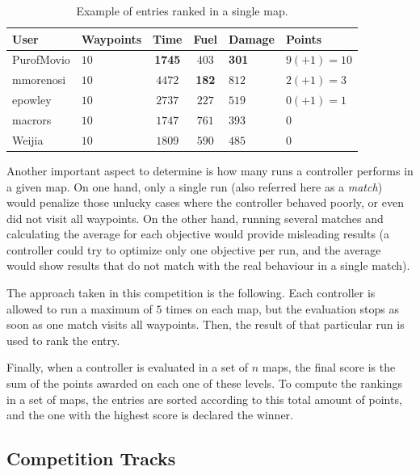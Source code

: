 \documentclass[conference]{IEEEtran}
\begin{document}
\begin{table}[!t]
\begin{center}
\begin{tabular}{|>{\centering\arraybackslash}m{1.25cm}|>{\centering\arraybackslash}m{1.15cm}|c|c|>{\centering\arraybackslash}m{0.9cm}|>{\centering\arraybackslash}m{1.5cm}|}
\hline
 \textbf{User} & \textbf{Waypoints} & \textbf{Time} & \textbf{Fuel} & \textbf{Damage} & \textbf{Points} \\ 
\hline
PurofMovio & $10$ & \textbf{1745} & $403$ & \textbf{301} & $9 (+1) = 10$\\
\hline
mmorenosi & $10$ & $4472$ & \textbf{182} & $812$ & $2 (+1) = 3$\\
\hline
epowley & $10$ & $2737$ & $227$ & $519$ & $0 (+1) = 1$\\
\hline
\hline
macrors & $10$ & $1747$ & $761$ & $393$ & $0$\\
\hline
Weijia & $10$ & $1809$ & $590$ & $485$ & $0$\\
\hline
\end{tabular}
\caption{Example of entries ranked in a single map. }
\label{tab:rankingSample}
\end{center}
\end{table}

Another important aspect to determine is how many runs a controller performs in a given map. On one hand, only a single run (also referred here as a \textit{match}) would penalize those unlucky cases where the controller behaved poorly, or even did not visit all waypoints. On the other hand, running several matches and calculating the average for each objective would provide misleading results (a controller could try to optimize only one objective per run, and the average would show results that do not match with the real behaviour in a single match).

The approach taken in this competition is the following. Each controller is allowed to run a maximum of $5$ times on each map, but the evaluation stops as soon as one match visits all waypoints. Then, the result of that particular run is used to rank the entry.

Finally, when a controller is evaluated in a set of $n$ maps, the final score is the sum of the points awarded on each one of these levels. To compute the rankings in a set of maps, the entries are sorted according to this total amount of points, and the one with the highest score is declared the winner.
	
	
\subsection{Competition Tracks}
\end{document}

